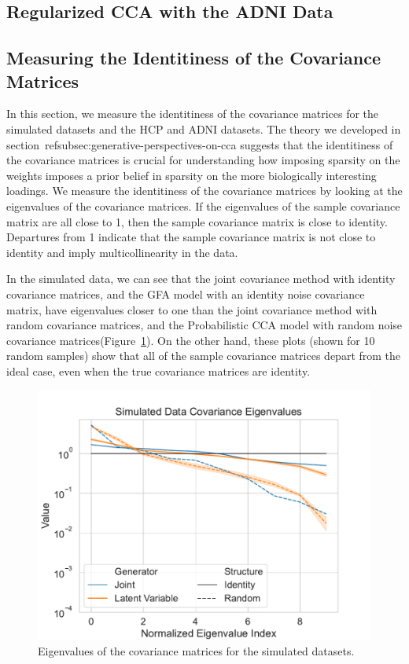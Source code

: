 \subsection{Regularized CCA with the ADNI Data}



\subsection{Measuring the Identitiness of the Covariance Matrices}

In this section, we measure the identitiness of the covariance matrices for the simulated datasets and the HCP and ADNI datasets.
The theory we developed in section~ref{subsec:generative-perspectives-on-cca} suggests that the identitiness of the covariance matrices is crucial for understanding how imposing sparsity on the weights imposes a prior belief in sparsity on the more biologically interesting loadings.
We measure the identitiness of the covariance matrices by looking at the eigenvalues of the covariance matrices.
If the eigenvalues of the sample covariance matrix are all close to 1, then the sample covariance matrix is close to identity.
Departures from 1 indicate that the sample covariance matrix is not close to identity and imply multicollinearity in the data.

In the simulated data, we can see that the joint covariance method with identity covariance matrices, and the GFA model with an identity noise covariance matrix, have eigenvalues closer to one than the joint covariance method with random covariance matrices, and the Probabilistic CCA model with random noise covariance matrices(Figure~\ref{fig:covariance-eigenvalues-simulated}).
On the other hand, these plots (shown for 10 random samples) show that all of the sample covariance matrices depart from the ideal case, even when the true covariance matrices are identity.

\begin{figure}
\centering
\includegraphics[width=0.8\linewidth]{figures/regularization/covariance/simulated_covariance_eigenvalues.pdf}
\caption{Eigenvalues of the covariance matrices for the simulated datasets.}\label{fig:covariance-eigenvalues-simulated}
\end{figure}

